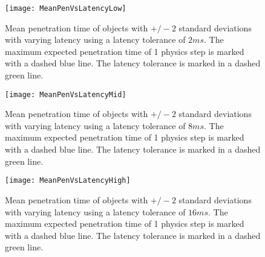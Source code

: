 \begin{figure}
	\centering
	\texttt{[image: MeanPenVsLatencyLow]}
	\caption{Mean penetration time of objects with $+/-2$ standard deviations with varying latency using a latency tolerance of $2ms$. The maximum expected penetration time of 1 physics step is marked with a dashed blue line. The latency tolerance is marked in a dashed green line.}
	\label{fig_CollisionsPenVsLatencyLow}
\end{figure}
\begin{figure}
	\centering
	\texttt{[image: MeanPenVsLatencyMid]}
	\caption{Mean penetration time of objects with $+/-2$ standard deviations with varying latency using a latency tolerance of $8ms$. The maximum expected penetration time of 1 physics step is marked with a dashed blue line. The latency tolerance is marked in a dashed green line.}
	\label{fig_CollisionsPenVsLatencyMid}
\end{figure}
\begin{figure}
	\centering
	\texttt{[image: MeanPenVsLatencyHigh]}
	\caption{Mean penetration time of objects with $+/-2$ standard deviations with varying latency using a latency tolerance of $16ms$. The maximum expected penetration time of 1 physics step is marked with a dashed blue line. The latency tolerance is marked in a dashed green line.}
	\label{fig_CollisionsPenVsLatencyHigh}
\end{figure}

%
%

